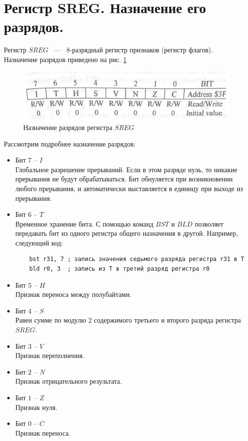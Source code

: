 \section{Регистр SREG. Назначение его  разрядов.}
Регистр $SREG$ ~---~ $8$-разрядный регистр признаков (регистр флагов).
Назначение разрядов приведено на рис. \ref{img::2_3_2}
\begin{figure}[h]
  \includegraphics[width=\linewidth]{./src/pics/2.3.2.png}
  \caption{Назначение разрядов регистра $SREG$}
  \label{img::2_3_2}
\end{figure}
Рассмотрим подробнее назначение разрядов:
\begin{itemize}
  \item Бит $7$ -- $I$\\
  Глобальное разрешение прерываний.
  Если в этом разряде нуль, то никакие прерывания не будут обрабатываться.
  Бит обнуляется при возникновении любого прерывания, 
  и автоматически выставляется в единицу при выходе из прерывания.
  \item Бит $6$ -- $T$\\
  Временное хранение бита.
  С помощью команд $BST$ и $BLD$ позволяет передавать
  бит из одного регистра общего назначения в другой. Например,
  следующий код:
  \begin{verbatim}
    bst r31, 7 ; запись значения седьмого разряда регистра r31 в T
    bld r0, 3  ; запись из T в третий разряд регистра r0
  \end{verbatim}
  \item Бит $5$ -- $H$\\
  Признак переноса между полубайтами.
  \item Бит $4$ -- $S$\\
  Равен сумме по модулю $2$ содержимого третьего и второго разряда
  регистра $SREG$.
  \item Бит $3$ -- $V$\\
  Признак переполнения.
  \item Бит $2$ -- $N$\\
  Признак отрицательного результата.
  \item Бит $1$ -- $Z$\\
  Признак нуля.
  \item Бит $0$ -- $C$\\
  Признак переноса.
\end{itemize}

